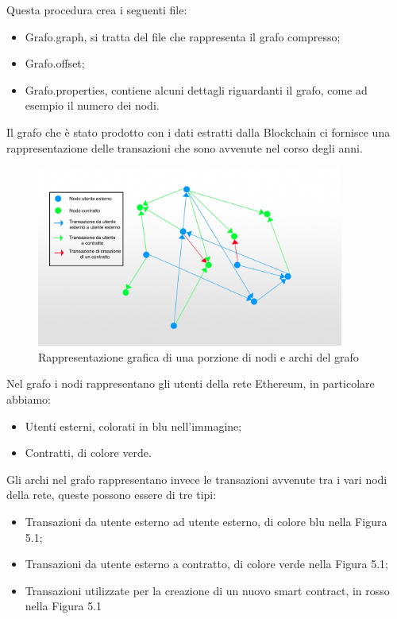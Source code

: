 \documentclass[12pt]{report}
\begin{document}
Questa procedura crea i seguenti file:

\begin{itemize}
    \item Grafo.graph, si tratta del file che rappresenta il grafo compresso;
    \item Grafo.offset;
    \item Grafo.properties, contiene alcuni dettagli riguardanti il grafo, come ad esempio il numero dei nodi.
\end{itemize}


Il grafo che è stato prodotto con i dati estratti dalla Blockchain ci fornisce una rappresentazione delle transazioni che sono avvenute nel corso degli anni.

\begin{figure}[H]
    \centering\includegraphics[width=0.9\textwidth]{GrafoFinito.jpg}
    \caption{Rappresentazione grafica di una porzione di nodi e archi del grafo}
\end{figure}

Nel grafo i nodi rappresentano gli utenti della rete Ethereum, in particolare abbiamo:

\begin{itemize}
    \item Utenti esterni, colorati in blu nell'immagine;
    \item Contratti, di colore verde.
\end{itemize}

Gli archi nel grafo rappresentano invece le transazioni avvenute tra i vari nodi della rete, queste possono essere di tre tipi:

\begin{itemize}
    \item Transazioni da utente esterno ad utente esterno, di colore blu nella Figura 5.1;
    \item Transazioni da utente esterno a contratto, di colore verde nella Figura 5.1;
    \item Transazioni utilizzate per la creazione di un nuovo smart contract, in rosso nella Figura 5.1
\end{itemize}
\end{document}
